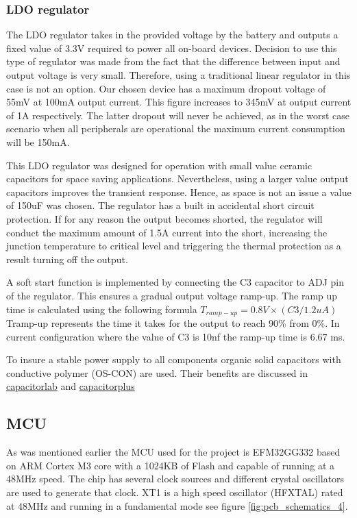\subsubsection{LDO regulator}
The LDO regulator takes in the provided voltage by the battery and outputs a fixed value of 3.3V required to power all on-board devices. Decision to use this type of regulator was made from the fact that the difference between input and output voltage is very small. Therefore, using a traditional linear regulator in this case is not an option. Our chosen device has a maximum dropout voltage of 55mV at 100mA output current. This figure increases to 345mV at output current of 1A respectively. 
The latter dropout will never be achieved, as in the worst case scenario when all peripherals are operational the maximum current consumption will be 150mA. 
 

This LDO regulator was designed for operation with small value ceramic capacitors for space saving applications. Nevertheless, using a larger value output capacitors improves the transient response. Hence, as space is not an issue a value of 150uF was chosen. The regulator has a built in accidental short circuit protection. If for any reason the output becomes shorted, the regulator will conduct the maximum amount of 1.5A current into the short, increasing the junction temperature to critical level and triggering the thermal protection as a result turning off the output. 

A soft start function is implemented by connecting the C3 capacitor to ADJ pin of the regulator. This ensures a gradual output voltage ramp-up. The ramp up time is calculated using the following formula $T_{ramp-up} = 0.8V × (C3/1.2uA)$ Tramp-up represents the time it takes for the output to reach 90\% from 0\%. In current configuration where the value of C3 is 10nf the ramp-up time is 6.67 ms.

To insure a stable power supply to all components organic solid capacitors with conductive polymer (OS-CON) are used. Their benefits are discussed in 
\href{http://www.capacitorlab.com/capacitor-types-polymer/}{capacitorlab}  and  \href{http://www.capacitorsplus.com/whatis.htm}{capacitorplus}


\subsection{MCU}
As was mentioned earlier the MCU used for the project is EFM32GG332 based on ARM Cortex M3 core with a 1024KB of Flash and capable of running at a 48MHz speed. The chip has several clock sources and different crystal oscillators are used to generate that clock. XT1 is a high speed oscillator (HFXTAL) rated at 48MHz and running in a fundamental mode see figure \ref{fig:pcb_schematics_4}. 

